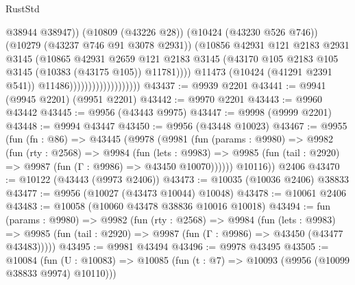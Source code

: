 \begin{lexlean}{RustStd}
\begin{coremodule}
                                                @38944
                                                @38947))
                                            (@10809 (@43226 @28))
                                            (@10424 (@43230 @526 @746))
                                            (@10279 (@43237 @746 @91 @3078 @2931))
                                            (@10856
                                              @42931
                                              @121
                                              @2183
                                              @2931
                                              @3145
                                              (@10865
                                                @42931
                                                @2659
                                                @121
                                                @2183
                                                @3145
                                                (@43170
                                                  @105
                                                  @2183
                                                  @105
                                                  @3145
                                                  (@10383 (@43175 @105))
                                                  @11781))))
                                          @11473
                                          (@10424 (@41291 @2391 @541))
                                          @11486)))))))))))))))))))
@43437 := @9939 @2201
@43441 := @9941 (@9945 @2201) (@9951 @2201)
@43442 := @9970 @2201
@43443 := @9960 @43442
@43445 := @9956 (@43443 @9975)
@43447 := @9998 (@9999 @2201)
@43448 := @9994 @43447
@43450 := @9956 (@43448 @10023)
@43467 := @9955
    (fun (fn : @86) =>
    @43445
      (@9978
        (@9981
          (fun (params : @9980) =>
          @9982
            (fun (rty : @2568) =>
            @9984
              (fun (lets : @9983) =>
              @9985 (fun (tail : @2920) => @9987 (fun (Γ : @9986) => @43450 @10070))))))
        @10116))
    @2406
@43470 := @10122 (@43443 (@9973 @2406))
@43473 := @10035 (@10036 @2406) @38833
@43477 := @9956 (@10027 (@43473 @10044) @10048)
@43478 := @10061 @2406
@43483 := @10058 (@10060 @43478 @38836 @10016 @10018)
@43494 := fun (params : @9980) =>
  @9982
    (fun (rty : @2568) =>
    @9984
      (fun (lets : @9983) =>
      @9985 (fun (tail : @2920) => @9987 (fun (Γ : @9986) => @43450 (@43477 @43483)))))
@43495 := @9981 @43494
@43496 := @9978 @43495
@43505 := @10084
    (fun (U : @10083) => @10085 (fun (t : @7) => @10093 (@9956 (@10099 @38833 @9974) @10110)))

\end{coremodule}
\end{lexlean}
